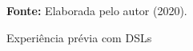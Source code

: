 \begin{figure}[ht!]
\centering

\caption{\textmd{Experiência prévia com DSLs}}
\label{fig:usodsl}

\par\medskip\textbf{Fonte:} Elaborada pelo autor (2020). \par\medskip

\end{figure}

